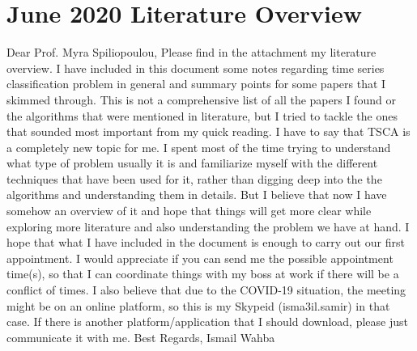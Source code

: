 \documentclass{article}
\begin{document}
\section*{\texorpdfstring{}. June 2020 Literature Overview}
Dear Prof. Myra Spiliopoulou,\newline
Please find in the attachment my literature overview.\newline
I have included in this document some notes regarding time series classification problem in general and summary points for some papers that I skimmed through.\newline
This is not a comprehensive list of all the papers I found or the algorithms that were mentioned in literature, but I tried to tackle the ones that sounded most important from my quick reading.\newline
I have to say that TSCA is a completely new topic for me. I spent most of the time trying to understand what type of problem usually it is and familiarize myself with the different techniques that have been used for it, rather than digging deep into the the algorithms and understanding them in details.\newline
But I believe that now I have somehow an overview of it and hope that things will get more clear while exploring more literature and also understanding the problem we have at hand.\newline
I hope that what I have included in the document is enough to carry out our first appointment.\newline
I would appreciate if you can send me the possible appointment time(s), so that I can coordinate things with my boss at work if there will be a conflict of times.\newline
I also believe that due to the COVID-19 situation, the meeting might be on an online platform, so this is my Skypeid (isma3il.samir) in that case. If there is another platform/application that I should download, please just communicate it with me.\newline
Best Regards,
Ismail Wahba
\end{document}
